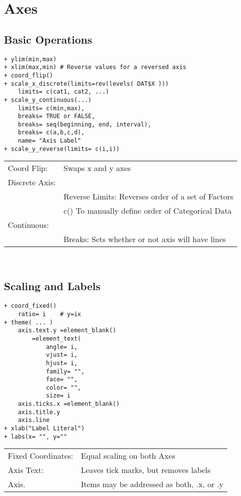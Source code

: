 \documentclass[]{article}
\begin{document}
\section{Axes}

\subsection{Basic Operations}
\begin{verbatim}
+ ylim(min,max)
+ xlim(max,min) # Reverse values for a reversed axis
+ coord_flip()
+ scale_x_discrete(limits=rev(levels( DAT$X )))
	limits= c(cat1, cat2, ...)
+ scale_y_continuous(...)
	limits= c(min,max),
	breaks= TRUE or FALSE,
	breaks= seq(beginning, end, interval),
	breaks= c(a,b,c,d),
	name= "Axis Label"
+ scale_y_reverse(limits= c(i,i))
\end{verbatim}
\begin{tabular}{l l}
	Coord Flip: & Swaps x and y axes \\
	Discrete Axis: & \\
		& Reverse Limits: Reverses order of a set of Factors \\	
		& c() To manually define order of Categorical Data \\
	Continuous: & \\
	 	& Breaks: Sets whether or not axis will have lines \\
\end{tabular} \\

\subsection{Scaling and Labels}
\begin{verbatim}
+ coord_fixed()
	ratio= i	# y=ix
+ theme( ... )
	axis.text.y =element_blank()
		=element_text(
			angle= i,
			vjust= i,
			hjust= i,
			family= "",
			face= "",
			color= "",
			size= i
	axis.ticks.x =element_blank()
	axis.title.y
	axis.line
+ xlab("Label Literal")
+ labs(x= "", y=""
\end{verbatim}
\begin{tabular}{l l}
	Fixed Coordinates: & Equal scaling on both Axes \\
	Axis Text: & Leaves tick marks, but removes labels \\
	Axis. & Items may be addressed as both, .x, or .y \\
\end{tabular} \\
\end{document}
